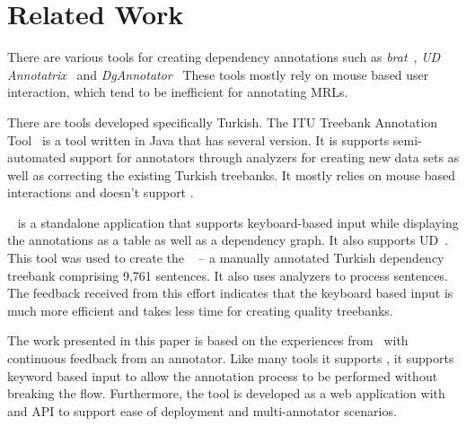 \section{Related Work}
\label{sec:related}

There are various tools for creating dependency annotations such as \textit{brat}~\cite{brat}, \textit{UD Annotatrix}~\cite{tyers-etal:2018} and \textit{DgAnnotator}~\cite{dgannotator}
These tools mostly rely on mouse based user interaction, which tend to be inefficient for annotating MRLs.

There are tools developed specifically Turkish.
The ITU Treebank Annotation Tool~\cite{pamay-etal-2015-annotation} is a tool written in Java that has several version.
It is supports semi-automated support for annotators through analyzers for creating new data sets as well as correcting the existing Turkish treebanks.
It mostly relies on mouse based interactions and doesn't support \ud. 

\boatvone~\cite{turk-etal-2019-turkish} is a standalone application that supports keyboard-based input while displaying the annotations as a table as well as a dependency graph.
It also supports UD~\cite{UD}. 
This tool was used to create the  \bountreebank~\cite{trk2020resources,UD-Boun-Treebank} -- a manually annotated Turkish dependency treebank comprising 9,761 sentences. It also uses analyzers to process sentences. 
The feedback received from this effort indicates that the keyboard based input is  much more efficient and takes less time for creating quality treebanks.

The work presented in this paper is based on the experiences from \boatvone\ with continuous feedback from an annotator. 
Like many tools it supports \ud, it supports keyword based input to allow the annotation process to be performed without breaking the flow. 
Furthermore, the tool is developed as a web application with and API to support ease of deployment and multi-annotator scenarios. 
